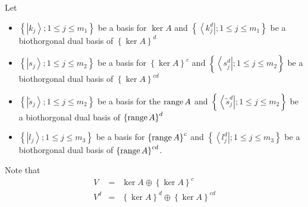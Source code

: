 Let

\begin{itemize}
\item $\left\{ \left| k_{j}\right\rangle ;1\leq j\leq m_{1}\right\} $ be a
basis for $\ker A$ and $\left\{ \left\langle k_{j}^{d}\right| ;1\leq j\leq
m_{1}\right\} $ be a biothorgonal dual basis of $\left\{ \ker A\right\} ^{d}$

\item $\left\{ \left| s_{j}\right\rangle ;1\leq j\leq m_{2}\right\} $ be a
basis for $\left\{ \ker A\right\} ^{c}$ and $\left\{ \left\langle
s_{j}^{d}\right| ;1\leq j\leq m_{2}\right\} $ be a biothorgonal dual basis
of $\left\{ \ker A\right\} ^{cd}$

\item $\left\{ \left| \tilde{s}_{j}\right\rangle ;1\leq j\leq m_{2}\right\} $
be a basis for the $%
\mathop{\rm range}%
A$ and $\left\{ \left\langle \tilde{s}_{j}^{d}\right| ;1\leq j\leq
m_{2}\right\} $ be a biothorgonal dual basis of $\left\{ 
\mathop{\rm range}%
A\right\} ^{d}$

\item $\left\{ \left| l_{j}\right\rangle ;1\leq j\leq m_{3}\right\} $ be a
basis for $\left\{ 
\mathop{\rm range}%
A\right\} ^{c}$ and $\left\{ \left\langle l_{j}^{d}\right| ;1\leq j\leq
m_{3}\right\} $ be a biothorgonal dual basis of $\left\{ 
\mathop{\rm range}%
A\right\} ^{cd}$.
\end{itemize}

Note that 
\begin{eqnarray}
V &=&\ker A\oplus \left\{ \ker A\right\} ^{c}  \nonumber \\
V^{d} &=&\left\{ \ker A\right\} ^{d}\oplus \left\{ \ker A\right\} ^{cd}
\end{eqnarray}


